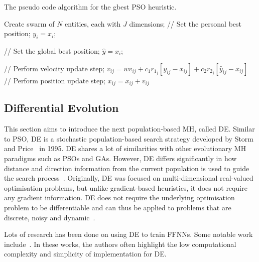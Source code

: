 \begin{algorithm}[H]
      \caption{The pseudo code algorithm for the gbest \acs{PSO} heuristic.}
      \label{algo:heuristics:pso:gbest}
      \begin{algorithmic}
            \State Create swarm of $N$ entities, each with $J$ dimensions;
            \State // Set the personal best position;
            \State $y_{i} = x_{i}$;
            \EndIf

            \State // Set the global best position;
            \State $\hat{y} = x_{i}$;
            \EndIf
            \EndFor

            \State // Perform velocity update step;
            \State $v_{ij} = wv_{ij} + c_{1}r_{1_{j}}[y_{ij} - x_{ij}] + c_{2}r_{2_{j}}[\hat{y}_{ij} - x_{ij}]$
            \State // Perform position update step;
            \State $x_{ij} = x_{ij} + v_{ij}$
            \EndFor
            \EndFor
            \EndWhile
      \end{algorithmic}
\end{algorithm}

\subsection{Differential Evolution}\label{sec:heuristics:mh:de}

This section aims to introduce the next population-based \acs{MH}, called \acf{DE}. Similar to \acs{PSO}, \acs{DE} is a stochastic population-based search strategy developed by Storm and Price~\cite{ref:price:2006} in 1995. \Ac{DE} shares a lot of similarities with other evolutionary \acs{MH} paradigms such as \acp{PSO} and \acp{GA}. However, \acs{DE} differs significantly in how distance and direction information from the current population is used to guide the search process~\cite{ref:engelbrecht:2007}. Originally, \acs{DE} was focused on multi-dimensional real-valued optimisation problems, but unlike gradient-based heuristics, it does not require any gradient information. \acs{DE} does not require the underlying optimisation problem to be differentiable and can thus be applied to problems that are discrete, noisy and dynamic~\cite{ref:rocca:2011}.

Lots of research has been done on using \acs{DE} to train \acp{FFNN}. Some notable work include~\cite{ref:ilonen:2003, ref:slowik:2008, ref:mingguang:2009}. In these works, the authors often highlight the low computational complexity and simplicity of implementation for \acs{DE}.

